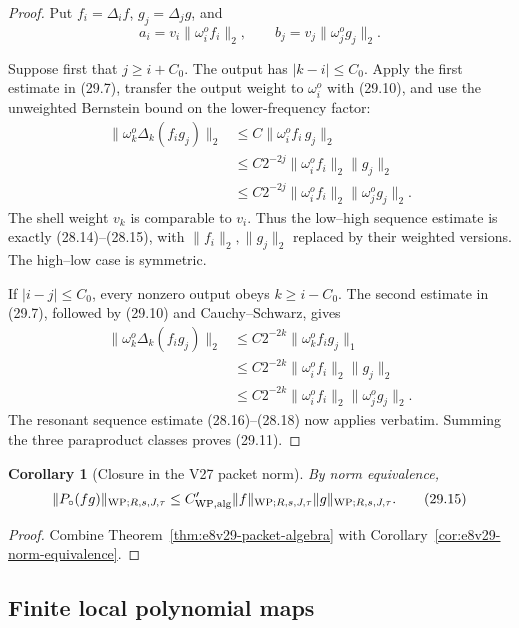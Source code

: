 \documentclass[11pt,oneside]{book}
\newtheorem{corollary}[theorem]{Corollary}
\theoremstyle{definition}
\theoremstyle{remark}
\begin{document}
\begin{proof}
Put \(f_i=\Delta_if\), \(g_j=\Delta_jg\), and
\[
 a_i=v_i\|\omega_i^of_i\|_2,\qquad
 b_j=v_j\|\omega_j^og_j\|_2.                                    \tag{29.12}
\]

Suppose first that \(j\geq i+C_0\).  The output has
\(|k-i|\leq C_0\).  Apply the first estimate in (29.7), transfer the
output weight to \(\omega_i^o\) with (29.10), and use the unweighted
Bernstein bound on the lower-frequency factor:
\[
\begin{split}
 \|\omega_k^o\Delta_k(f_i g_j)\|_2
 &\leq C\|\omega_i^of_i\,g_j\|_2\\
 &\leq C2^{-2j}
       \|\omega_i^of_i\|_2\|g_j\|_2\\
 &\leq C2^{-2j}
       \|\omega_i^of_i\|_2\|\omega_j^og_j\|_2.                   \tag{29.13}
\end{split}
\]
The shell weight \(v_k\) is comparable to \(v_i\).  Thus the
low--high sequence estimate is exactly (28.14)--(28.15), with
\(\|f_i\|_2,\|g_j\|_2\) replaced by their weighted versions.
The high--low case is symmetric.

If \(|i-j|\leq C_0\), every nonzero output obeys
\(k\geq i-C_0\).  The second estimate in (29.7), followed by
(29.10) and Cauchy--Schwarz, gives
\[
\begin{split}
 \|\omega_k^o\Delta_k(f_i g_j)\|_2
 &\leq C2^{-2k}\|\omega_k^of_i g_j\|_1\\
 &\leq C2^{-2k}
       \|\omega_i^of_i\|_2\|g_j\|_2\\
 &\leq C2^{-2k}
       \|\omega_i^of_i\|_2\|\omega_j^og_j\|_2.                   \tag{29.14}
\end{split}
\]
The resonant sequence estimate (28.16)--(28.18) now applies verbatim.
Summing the three paraproduct classes proves (29.11).
\end{proof}

\begin{corollary}[Closure in the V27 packet norm]
\label{cor:e8v29-V27-algebra}
By norm equivalence,
\[
 \|P_\circ(fg)\|_{{\rm WP};R,s,J,\tau}
 \leq
 C'_{\rm WP,alg}
 \|f\|_{{\rm WP};R,s,J,\tau}
 \|g\|_{{\rm WP};R,s,J,\tau}.                                   \tag{29.15}
\]
\end{corollary}

\begin{proof}
Combine Theorem~\ref{thm:e8v29-packet-algebra} with
Corollary~\ref{cor:e8v29-norm-equivalence}.
\end{proof}

\subsection{Finite local polynomial maps}
\end{document}
